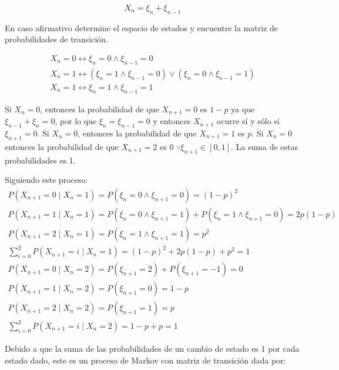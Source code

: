 \documentclass{article}
\begin{document}
            \begin{equation}
                X_n = \xi_n + \xi_{n-1}
            \end{equation}

            En caso afirmativo determine el espacio de estados y encuentre la matriz de probabilidades de transición.

            \begin{gather*}
                X_n = 0 \leftrightarrow \xi_n = 0 \land \xi_{n-1} = 0 \\
                X_n = 1 \leftrightarrow (\xi_n = 1 \land \xi_{n-1} = 0) \lor (\xi_n = 0 \land \xi_{n-1} = 1) \\
                X_n = 1 \leftrightarrow \xi_n = 1 \land \xi_{n-1} = 1 
            \end{gather*}

            Si $X_n = 0$, entonces la probabilidad de que $X_{n+1} = 0$ es $1 - p$ ya que $\xi_{n-1} + \xi_{n} = 0$, por lo que $\xi_{n} = \xi_{n-1} = 0$ y entonces $X_{n+1}$ ocurre sí y sólo si $\xi_{n+1} = 0$. Si $X_n = 0$, entonces la probabilidad de que $X_{n+1} = 1$ es $p$. Si $X_n = 0$ entonces la probabilidad de que $X_{n+1} = 2$ es 0 $\because \xi_{n+1} \in \left[0, 1\right]$. La suma de estas probabilidades es 1.

            Siguiendo este proceso:
            \begin{gather*}
                P(X_{n+1} = 0 \mid X_n = 1) = P(\xi_n = 0 \land \xi_{n+1} = 0) = (1 - p)^{2} \\
                P(X_{n+1} = 1 \mid X_n = 1) = P(\xi_n = 0 \land \xi_{n+1} = 1) + P(\xi_n = 1 \land \xi_{n+1} = 0) = 2p (1 - p) \\
                P(X_{n+1} = 2 \mid X_n = 1) = P(\xi_n = 1 \land \xi_{n+1} = 1) = p^{2} \\
                \sum_{i=0}^{2} P(X_{n+1} = i \mid X_n = 1) = (1 - p)^{2} + 2p (1 - p) + p^{2} = 1 \\
                P(X_{n+1} = 0 \mid X_n = 2) = P(\xi_{n + 1} = 2) + P(\xi_{n + 1} = -1) = 0 \\
                P(X_{n+1} = 1 \mid X_n = 2) = P(\xi_{n+1} = 0) = 1-p \\
                P(X_{n+1} = 2 \mid X_n = 2) = P(\xi_{n+1} = 1) = p \\
                \sum_{i=0}^{2} P(X_{n+1} = i \mid X_n = 2) = 1 - p + p = 1
            \end{gather*}

            Debido a que la suma de las probabilidades de un cambio de estado es 1 por cada estado dado, este es un proceso de Markov con matriz de transición dada por:
\end{document}
